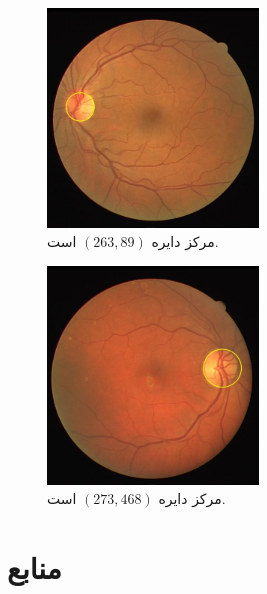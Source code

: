 \documentclass{article}
\begin{document}
\subsection{}
\begin{figure}[H]
    \centering
    \includegraphics[width=0.5\textwidth]{figures/2.jpg}
    \caption
	{
مرکز دایره 
$(263, 89)$
است.
	}
    \label{fig:fig1}
\end{figure}
\begin{figure}[H]
    \centering
    \includegraphics[width=0.5\textwidth]{figures/3.jpg}
    \caption
	{
مرکز دایره 
$(273, 468)$
است.
	}
    \label{fig:fig1}
\end{figure}






\section*{منابع}
\renewcommand{\section}[2]{}%
\begin{thebibliography}{99} %


\begin{LTRitems}

\resetlatinfont

\end{LTRitems}

\end{thebibliography}
\end{document}
